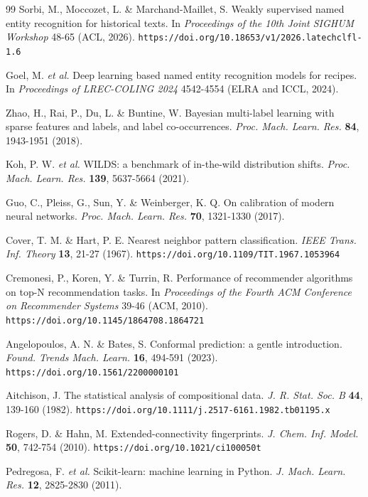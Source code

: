 \documentclass[11pt]{article}
\begin{document}
\begin{thebibliography}{99}
Sorbi, M., Moccozet, L. \& Marchand-Maillet, S. Weakly supervised named entity recognition for historical texts. In \emph{Proceedings of the 10th Joint SIGHUM Workshop} 48-65 (ACL, 2026). \nolinkurl{https://doi.org/10.18653/v1/2026.latechclfl-1.6}

Goel, M. \emph{et al.} Deep learning based named entity recognition models for recipes. In \emph{Proceedings of LREC-COLING 2024} 4542-4554 (ELRA and ICCL, 2024).

Zhao, H., Rai, P., Du, L. \& Buntine, W. Bayesian multi-label learning with sparse features and labels, and label co-occurrences. \emph{Proc. Mach. Learn. Res.} \textbf{84}, 1943-1951 (2018).

Koh, P. W. \emph{et al.} WILDS: a benchmark of in-the-wild distribution shifts. \emph{Proc. Mach. Learn. Res.} \textbf{139}, 5637-5664 (2021).

Guo, C., Pleiss, G., Sun, Y. \& Weinberger, K. Q. On calibration of modern neural networks. \emph{Proc. Mach. Learn. Res.} \textbf{70}, 1321-1330 (2017).

Cover, T. M. \& Hart, P. E. Nearest neighbor pattern classification. \emph{IEEE Trans. Inf. Theory} \textbf{13}, 21-27 (1967). \nolinkurl{https://doi.org/10.1109/TIT.1967.1053964}

Cremonesi, P., Koren, Y. \& Turrin, R. Performance of recommender algorithms on top-N recommendation tasks. In \emph{Proceedings of the Fourth ACM Conference on Recommender Systems} 39-46 (ACM, 2010). \nolinkurl{https://doi.org/10.1145/1864708.1864721}

Angelopoulos, A. N. \& Bates, S. Conformal prediction: a gentle introduction. \emph{Found. Trends Mach. Learn.} \textbf{16}, 494-591 (2023). \nolinkurl{https://doi.org/10.1561/2200000101}

Aitchison, J. The statistical analysis of compositional data. \emph{J. R. Stat. Soc. B} \textbf{44}, 139-160 (1982). \nolinkurl{https://doi.org/10.1111/j.2517-6161.1982.tb01195.x}

Rogers, D. \& Hahn, M. Extended-connectivity fingerprints. \emph{J. Chem. Inf. Model.} \textbf{50}, 742-754 (2010). \nolinkurl{https://doi.org/10.1021/ci100050t}

Pedregosa, F. \emph{et al.} Scikit-learn: machine learning in Python. \emph{J. Mach. Learn. Res.} \textbf{12}, 2825-2830 (2011).


\end{thebibliography}
\end{document}
